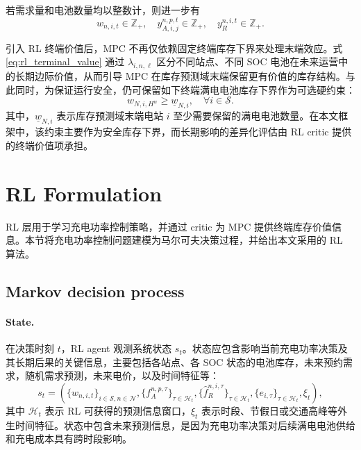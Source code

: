 \documentclass[12pt,hyperref,a4paper,UTF8]{ctexart}
\begin{document}
若需求量和电池数量均以整数计，则进一步有
\begin{equation}
w_{n,i,t}\in \mathbb{Z}_{+},\quad
 y_{A,i,j}^{n,p,t}\in \mathbb{Z}_{+},\quad
 y_R^{n,i,t}\in \mathbb{Z}_{+}.
\label{eq:integer}
\end{equation}

引入 RL 终端价值后，MPC 不再仅依赖固定终端库存下界来处理末端效应。式\eqref{eq:rl_terminal_value} 通过 $\lambda_{i,n,\ell}$ 区分不同站点、不同 SOC 电池在未来运营中的长期边际价值，从而引导 MPC 在库存预测域末端保留更有价值的库存结构。与此同时，为保证运行安全，仍可保留如下终端满电电池库存下界作为可选硬约束：
\begin{equation}
w_{N,i,H^w}\ge \underline{w}_{N,i},
\quad \forall i\in \mathcal{S}.
\label{eq:terminal_inventory}
\end{equation}
其中，$\underline{w}_{N,i}$ 表示库存预测域末端电站 $i$ 至少需要保留的满电电池数量。在本文框架中，该约束主要作为安全库存下界，而长期影响的差异化评估由 RL critic 提供的终端价值项承担。

\section{RL Formulation}

RL 层用于学习充电功率控制策略，并通过 critic 为 MPC 提供终端库存价值信息。本节将充电功率控制问题建模为马尔可夫决策过程，并给出本文采用的 RL 算法。

\subsection{Markov decision process}

\paragraph{State.}
在决策时刻 $t$，RL agent 观测系统状态 $s_t$。状态应包含影响当前充电功率决策及其长期后果的关键信息，主要包括各站点、各 SOC 状态的电池库存，未来预约需求，随机需求预测，未来电价，以及时间特征等：
\begin{equation}
s_t=
\left(
\{w_{n,i,t}\}_{i\in\mathcal{S},n\in\mathcal{N}},
\{f_A^{n,p,\tau}\}_{\tau\in\mathcal{H}_t},
\{\hat f_R^{n,i,\tau}\}_{\tau\in\mathcal{H}_t},
\{e_{i,\tau}\}_{\tau\in\mathcal{H}_t},
\xi_t
\right),
\label{eq:rl_state}
\end{equation}
其中 $\mathcal{H}_t$ 表示 RL 可获得的预测信息窗口，$\xi_t$ 表示时段、节假日或交通高峰等外生时间特征。状态中包含未来预测信息，是因为充电功率决策对后续满电电池供给和充电成本具有跨时段影响。
\end{document}
